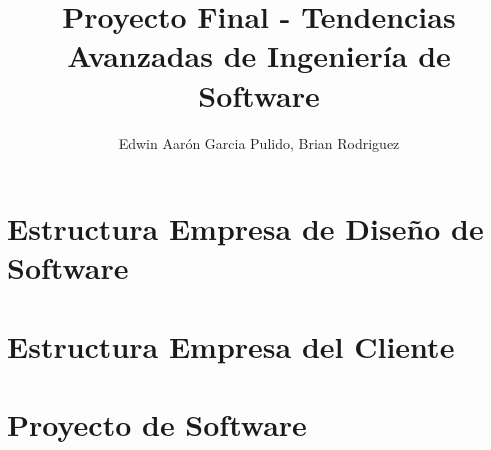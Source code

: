 \documentclass[12pt,letterpaper]{book}
\title{Proyecto Final - Tendencias Avanzadas de Ingeniería de Software}
\author{Edwin Aarón Garcia Pulido, Brian Rodriguez}
\begin{document}
\maketitle
\tableofcontents

\part{Estructura Empresa de Diseño de Software}


\part{Estructura Empresa del Cliente}


\part{Proyecto de Software}





\end{document}
